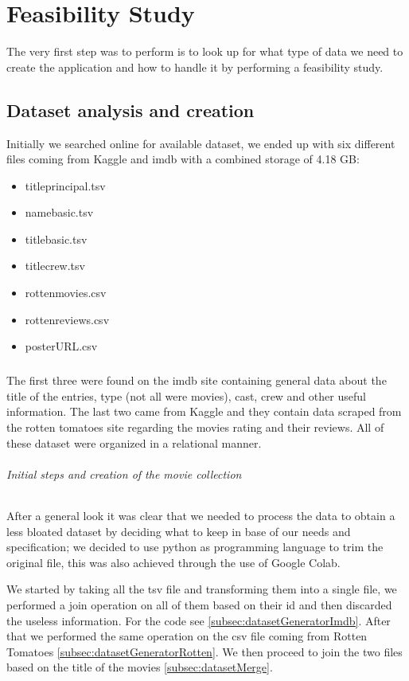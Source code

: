 %


%

\chapter{Feasibility Study}
\justifying
The very first step was to perform is to look up for what type of data we need to create the application and how to handle it by performing a feasibility study.
\section{Dataset analysis and creation}
Initially we searched online for available dataset, we ended up with six different files coming from Kaggle and imdb with a combined storage of 4.18 GB:
\begin{itemize}
  \item title\textunderscore principal.tsv  
  \item name\textunderscore basic.tsv 
  \item title\textunderscore basic.tsv 
  \item title\textunderscore crew.tsv
  \item rotten\textunderscore movies.csv
  \item rotten\textunderscore reviews.csv 
  \item poster\textunderscore URL.csv
\end{itemize} 
\paragraph{}
The first three were found on the imdb site containing general data about the title of the entries, type (not all were movies), cast, crew and other useful information. The last two came from Kaggle and they contain data scraped from the rotten tomatoes site regarding the movies rating and their reviews. All of these dataset were organized in a relational manner.
\subparagraph{Initial steps and creation of the movie collection}
After a general look it was clear that we needed to process the data to obtain a less bloated dataset by deciding what to keep in base of our needs and specification; we decided to use python as programming language to trim the original file, this was also achieved through the use of Google Colab.

We started by taking all the tsv file and transforming them into a single file, we performed a join operation on all of them based on their id and then discarded the useless information. For the code see  \cref{subsec:datasetGeneratorImdb}. After that we performed the same operation on the csv file coming from Rotten Tomatoes \cref{subsec:datasetGeneratorRotten}. We then proceed to join the two files based on the title of the movies \cref{subsec:datasetMerge}.

